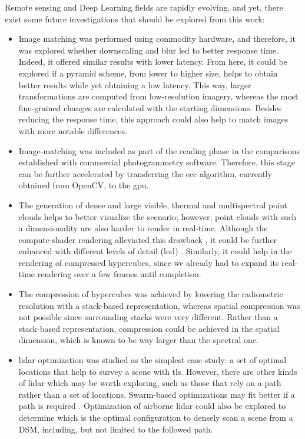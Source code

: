 Remote sensing and Deep Learning fields are rapidly evolving, and yet, there exist some future investigations that should be explored from this work:
\begin{itemize}
    \item Image matching was performed using commodity hardware, and therefore, it was explored whether downscaling and blur led to better response time. Indeed, it offered similar results with lower latency. From here, it could be explored if a pyramid scheme, from lower to higher size, helps to obtain better results while yet obtaining a low latency. This way, larger transformations are computed from low-resolution imagery, whereas the most fine-grained changes are calculated with the starting dimensions. Besides reducing the response time, this approach could also help to match images with more notable differences.
    \item Image-matching was included as part of the reading phase in the comparisons established with commercial photogrammetry software. Therefore, this stage can be further accelerated by transferring the \acrshort{ecc} algorithm, currently obtained from OpenCV, to the \acrshort{gpu}.
    \item The generation of dense and large visible, thermal and multispectral point clouds helps to better visualize the scenario; however, point clouds with such a dimensionality are also harder to render in real-time. Although the compute-shader rendering alleviated this drawback \cite{schutz_rendering_2021}, it could be further enhanced with different levels of detail (\acrshort{lod}) \cite{schutz_gpu-accelerated_2023}. Similarly, it could help in the rendering of compressed hypercubes, since we already had to expand its real-time rendering over a few frames until completion.
    \item The compression of hypercubes was achieved by lowering the radiometric resolution with a stack-based representation, whereas spatial compression was not possible since surrounding stacks were very different. Rather than a stack-based representation, compression could be achieved in the spatial dimension, which is known to be way larger than the spectral one. 
    \item \acrshort{lidar} optimization was studied as the simplest case study: a set of optimal locations that help to survey a scene with \acrshort{tls}. However, there are other kinds of \acrshort{lidar} which may be worth exploring, such as those that rely on a path rather than a set of locations. Swarm-based optimizations may fit better if a path is required \cite{roberge_fast_2018}. Optimization of airborne \acrshort{lidar} could also be explored to determine which is the optimal configuration to densely scan a scene from a DSM, including, but not limited to the followed path.

\end{itemize}
